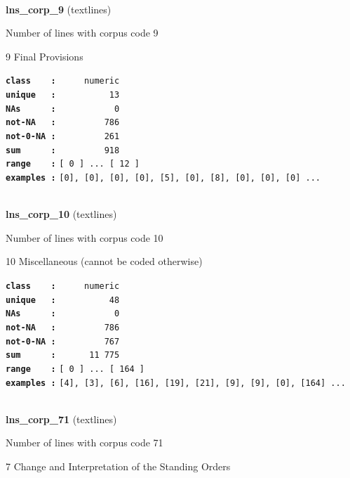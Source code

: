 \documentclass[]{article}
\begin{document}
~

\textbf{lns\_corp\_9} (textlines)

Number of lines with corpus code 9

9 Final Provisions

\textbf{\texttt{class\ \ \ \ :}} \texttt{~~~~~numeric}\\
\textbf{\texttt{unique\ \ \ :}} \texttt{~~~~~~~~~~13}\\
\textbf{\texttt{NAs\ \ \ \ \ \ :}} \texttt{~~~~~~~~~~~0}\\
\textbf{\texttt{not-NA\ \ \ :}} \texttt{~~~~~~~~~786}\\
\textbf{\texttt{not-0-NA\ :}} \texttt{~~~~~~~~~261}\\
\textbf{\texttt{sum\ \ \ \ \ \ :}} \texttt{~~~~~~~~~918}\\
\textbf{\texttt{range\ \ \ \ :}}
\texttt{{[}\ 0\ {]}\ ...\ {[}\ 12\ {]}}\\
\textbf{\texttt{examples\ :}}
\texttt{{[}0{]},\ {[}0{]},\ {[}0{]},\ {[}0{]},\ {[}5{]},\ {[}0{]},\ {[}8{]},\ {[}0{]},\ {[}0{]},\ {[}0{]}\ ...}\\

~

\textbf{lns\_corp\_10} (textlines)

Number of lines with corpus code 10

10 Miscellaneous (cannot be coded otherwise)

\textbf{\texttt{class\ \ \ \ :}} \texttt{~~~~~numeric}\\
\textbf{\texttt{unique\ \ \ :}} \texttt{~~~~~~~~~~48}\\
\textbf{\texttt{NAs\ \ \ \ \ \ :}} \texttt{~~~~~~~~~~~0}\\
\textbf{\texttt{not-NA\ \ \ :}} \texttt{~~~~~~~~~786}\\
\textbf{\texttt{not-0-NA\ :}} \texttt{~~~~~~~~~767}\\
\textbf{\texttt{sum\ \ \ \ \ \ :}} \texttt{~~~~~~11~775}\\
\textbf{\texttt{range\ \ \ \ :}}
\texttt{{[}\ 0\ {]}\ ...\ {[}\ 164\ {]}}\\
\textbf{\texttt{examples\ :}}
\texttt{{[}4{]},\ {[}3{]},\ {[}6{]},\ {[}16{]},\ {[}19{]},\ {[}21{]},\ {[}9{]},\ {[}9{]},\ {[}0{]},\ {[}164{]}\ ...}\\

~

\textbf{lns\_corp\_71} (textlines)

Number of lines with corpus code 71

7 Change and Interpretation of the Standing Orders
\end{document}
